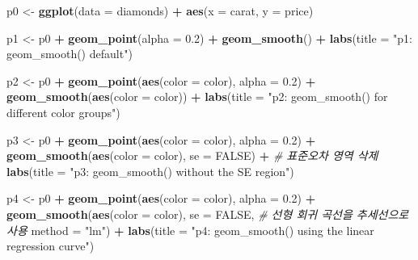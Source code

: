 \documentclass[
  11pt,
]{krantz}
\newenvironment{Shaded}{\begin{snugshade}}{\end{snugshade}}
\newcommand{\CommentTok}[1]{\textcolor[rgb]{0.37,0.37,0.37}{\textit{#1}}}
\newcommand{\DataTypeTok}[1]{\textcolor[rgb]{0.27,0.27,0.27}{#1}}
\newcommand{\FloatTok}[1]{\textcolor[rgb]{0.06,0.06,0.06}{#1}}
\newcommand{\KeywordTok}[1]{\textcolor[rgb]{0.27,0.27,0.27}{\textbf{#1}}}
\newcommand{\NormalTok}[1]{#1}
\newcommand{\OperatorTok}[1]{\textcolor[rgb]{0.43,0.43,0.43}{\textbf{#1}}}
\newcommand{\OtherTok}[1]{\textcolor[rgb]{0.37,0.37,0.37}{#1}}
\newcommand{\StringTok}[1]{\textcolor[rgb]{0.5,0.5,0.5}{#1}}
\begin{document}
\begin{Shaded}
\begin{Highlighting}[]
\NormalTok{p0 <-}\StringTok{ }\KeywordTok{ggplot}\NormalTok{(}\DataTypeTok{data =}\NormalTok{ diamonds) }\OperatorTok{+}\StringTok{ }
\StringTok{  }\KeywordTok{aes}\NormalTok{(}\DataTypeTok{x =}\NormalTok{ carat, }\DataTypeTok{y =}\NormalTok{ price)}

\NormalTok{p1 <-}\StringTok{ }\NormalTok{p0 }\OperatorTok{+}\StringTok{ }
\StringTok{  }\KeywordTok{geom_point}\NormalTok{(}\DataTypeTok{alpha =} \FloatTok{0.2}\NormalTok{) }\OperatorTok{+}\StringTok{ }
\StringTok{  }\KeywordTok{geom_smooth}\NormalTok{() }\OperatorTok{+}\StringTok{ }
\StringTok{  }\KeywordTok{labs}\NormalTok{(}\DataTypeTok{title =} \StringTok{"p1: geom_smooth() default"}\NormalTok{)}

\NormalTok{p2 <-}\StringTok{ }\NormalTok{p0 }\OperatorTok{+}\StringTok{ }
\StringTok{  }\KeywordTok{geom_point}\NormalTok{(}\KeywordTok{aes}\NormalTok{(}\DataTypeTok{color =}\NormalTok{ color), }
             \DataTypeTok{alpha =} \FloatTok{0.2}\NormalTok{) }\OperatorTok{+}\StringTok{ }
\StringTok{  }\KeywordTok{geom_smooth}\NormalTok{(}\KeywordTok{aes}\NormalTok{(}\DataTypeTok{color =}\NormalTok{ color)) }\OperatorTok{+}\StringTok{ }
\StringTok{  }\KeywordTok{labs}\NormalTok{(}\DataTypeTok{title =} \StringTok{"p2: geom_smooth() for different color groups"}\NormalTok{)}

\NormalTok{p3 <-}\StringTok{ }\NormalTok{p0 }\OperatorTok{+}\StringTok{ }
\StringTok{  }\KeywordTok{geom_point}\NormalTok{(}\KeywordTok{aes}\NormalTok{(}\DataTypeTok{color =}\NormalTok{ color), }
             \DataTypeTok{alpha =} \FloatTok{0.2}\NormalTok{) }\OperatorTok{+}\StringTok{ }
\StringTok{  }\KeywordTok{geom_smooth}\NormalTok{(}\KeywordTok{aes}\NormalTok{(}\DataTypeTok{color =}\NormalTok{ color), }
              \DataTypeTok{se =} \OtherTok{FALSE}\NormalTok{) }\OperatorTok{+}\StringTok{ }\CommentTok{# 표준오차 영역 삭제}
\StringTok{  }\KeywordTok{labs}\NormalTok{(}\DataTypeTok{title =} \StringTok{"p3: geom_smooth() without the SE region"}\NormalTok{)}

\NormalTok{p4 <-}\StringTok{ }\NormalTok{p0 }\OperatorTok{+}\StringTok{ }
\StringTok{    }\KeywordTok{geom_point}\NormalTok{(}\KeywordTok{aes}\NormalTok{(}\DataTypeTok{color =}\NormalTok{ color), }
             \DataTypeTok{alpha =} \FloatTok{0.2}\NormalTok{) }\OperatorTok{+}\StringTok{ }
\StringTok{  }\KeywordTok{geom_smooth}\NormalTok{(}\KeywordTok{aes}\NormalTok{(}\DataTypeTok{color =}\NormalTok{ color), }
              \DataTypeTok{se =} \OtherTok{FALSE}\NormalTok{, }
\CommentTok{# 선형 회귀 곡선을 추세선으로 사용}
              \DataTypeTok{method =} \StringTok{"lm"}\NormalTok{) }\OperatorTok{+}\StringTok{ }
\StringTok{  }\KeywordTok{labs}\NormalTok{(}\DataTypeTok{title =} \StringTok{"p4: geom_smooth() using the linear regression curve"}\NormalTok{)  }
\end{Highlighting}
\end{Shaded}
\end{document}
